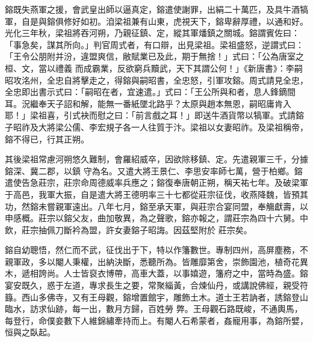 \begin{pinyinscope}
鎔既失燕軍之援，會武皇出師以逼真定，鎔遣使謝罪，出絹二十萬匹，及具牛酒犒軍，自是與鎔俱修好如初。洎梁祖兼有山東，虎視天下，鎔卑辭厚禮，以通和好。
 光化三年秋，梁祖將吞河朔，乃親征鎮、定，縱其軍燔鎮之關城。鎔謂賓佐曰：「事急矣，謀其所向。」判官周式者，有口辯，出見梁祖。梁祖盛怒，逆謂式曰：「王令公朋附并汾，違盟爽信，敝賦業已及此，期于無捨！」式曰：「公為唐室之桓、文，當以禮義
 而成霸業，反欲窮兵黷武，天下其謂公何！」《新唐書》：李嗣昭攻洺州，全忠自將擊走之，得鎔與嗣昭書，全忠怒，引軍攻鎔。周式請見全忠，全忠即出書示式曰：「嗣昭在者，宜速遣。」式曰：「王公所與和者，息人鋒鏑間耳。況繼奉天子詔和解，能無一番紙墜北路乎？太原與趙本無恩，嗣昭庸肯入耶！」梁祖喜，引式袂而慰之曰：「前言戲之耳！」即送牛酒貨幣以犒軍。式請鎔子昭祚及大將梁公儒、李宏規子各一人往質于汴。梁祖以女妻昭祚。及梁祖稱帝，鎔不得已，行其正朔。



 其後梁祖常慮河朔悠久難制，會羅紹威卒，因欲除移鎮、定。先遣親軍三千，分據鎔深、冀二郡，以鎮
 守為名。又遣大將王景仁、李思安率師七萬，營于柏鄉。鎔遣使告急莊宗，莊宗命周德威率兵應之；鎔復奉唐朝正朔，稱天祐七年。及破梁軍于高邑，我軍大振，自是遣大將王德明率三十七都從莊宗征伐，收燕降魏，皆預其功，然鎔未嘗親軍遠出。八年七月，鎔至承天軍，與莊宗合宴同盟，奉觴獻壽，以申感概。莊宗以鎔父友，曲加敬異，為之聲歌，鎔亦報之，謂莊宗為四十六舅。中飲，莊宗抽佩刀斷衿為盟，許女妻鎔子昭誨。因茲堅附於
 莊宗矣。



 鎔自幼聰悟，然仁而不武，征伐出于下，特以作籓數世。專制四州，高屏塵務，不親軍政，多以閹人秉權，出納決斷，悉聽所為。皆雕靡第舍，崇飾園池，植奇花異木，遞相誇尚。人士皆裒衣博帶，高車大蓋，以事嬉遊，籓府之中，當時為盛。鎔宴安既久，惑于左道，專求長生之要，常聚緇黃，合煉仙丹，或講說佛經，親受符籙。西山多佛寺，又有王母觀，鎔增置館宇，雕飾土木。道士王若訥者，誘鎔登山臨水，訪求仙跡，每一出，數月方歸，百姓勞
 弊。王母觀石路既峻，不通輿馬，每登行，命僕妾數下人維錦繡牽持而上。有閹人石希蒙者，姦寵用事，為鎔所嬖，恒與之臥起。




\end{pinyinscope}
